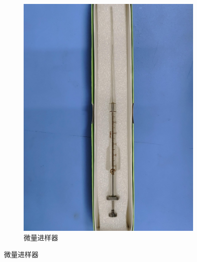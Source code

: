 \documentclass[a4paper]{report} %
\begin{document}
\begin{figure}[H]
\begin{subfigure}{0.22\textwidth}
        \includegraphics[width=\linewidth]{微量进样器.jpg}
        \caption{微量进样器}
    \end{subfigure}


\end{figure}
\end{document}
